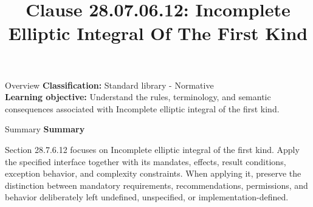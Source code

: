 \documentclass[10pt,letterpaper]{article}
\title{Clause 28.07.06.12: Incomplete Elliptic Integral Of The First Kind}
\author{}
\date{}
\begin{document}
\maketitle
\begin{CornellOverviewBox}{Overview}
\textbf{Classification:} Standard library - Normative\\[2pt]
\textbf{Learning objective:} Understand the rules, terminology, and semantic consequences associated with Incomplete elliptic integral of the first kind.
\end{CornellOverviewBox}\begin{CornellSummaryBox}{Summary}
{\sffamily\bfseries\color{Accent} Summary}\par\vspace{3pt}Section 28.7.6.12 focuses on Incomplete elliptic integral of the first kind. Apply the specified interface together with its mandates, effects, result conditions, exception behavior, and complexity constraints. When applying it, preserve the distinction between mandatory requirements, recommendations, permissions, and behavior deliberately left undefined, unspecified, or implementation-defined.
\end{CornellSummaryBox}
\end{document}
